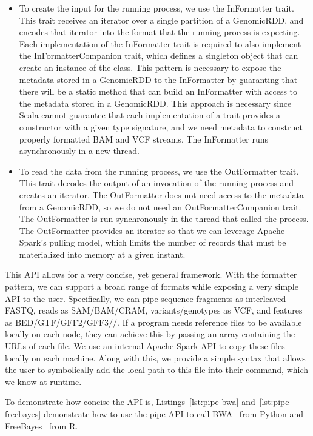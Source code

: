 \documentclass[phd]{ucbthesis}
\begin{document}
\begin{itemize}
\item To create the input for the running process, we use the
  {InFormatter} trait. This trait receives an iterator over a single
  partition of a {GenomicRDD}, and encodes that iterator into the format
  that the running process is expecting. Each implementation of the
  {InFormatter} trait is required to also implement the
  {InFormatterCompanion} trait, which defines a singleton object that
  can create an instance of the class. This pattern is necessary to expose
  the metadata stored in a {GenomicRDD} to the {InFormatter} by
  guaranting that there will be a static method that can build an
  {InFormatter} with access to the metadata stored in a
  {GenomicRDD}. This approach is necessary since {Scala} cannot
  guarantee that each implementation of a trait provides a constructor with a
  given type signature, and we need metadata to construct properly formatted
  BAM and VCF streams. The {InFormatter} runs asynchronously in a new
  thread.
\item To read the data from the running process, we use the
  {OutFormatter} trait. This trait decodes the output of an invocation of
  the running process and creates an iterator. The {OutFormatter} does
  not need access to the metadata from a {GenomicRDD}, so we do not need
  an {OutFormatterCompanion} trait. The {OutFormatter} is run
  synchronously in the thread that called the process. The {OutFormatter}
  provides an iterator so that we can leverage {Apache Spark}'s pulling
  model, which limits the number of records that must be materialized into
  memory at a given instant.
\end{itemize}

This API allows for a very concise, yet general framework. With the
formatter pattern, we can support a broad range of formats while exposing a
very simple API to the user. Specifically, we can pipe sequence fragments as
interleaved FASTQ, reads as SAM/BAM/CRAM, variants/genotypes as VCF, and
features as BED/GTF/GFF2/GFF3//. If
a program needs reference files to be available locally on each node, they can
achieve this by passing an array containing the URLs of each file. We use an
internal {Apache Spark} API to copy these files locally on each machine.
Along with this, we provide a simple syntax that allows the user to symbolically
add the local path to this file into their command, which we know at runtime.

To demonstrate how concise the API is, Listings~\ref{lst:pipe-bwa}
and~\ref{lst:pipe-freebayes} demonstrate how to use the {pipe}
API to call BWA~\cite{li09bwa} from {Python} and
{FreeBayes}~\cite{garrison12} from R.
\end{document}
